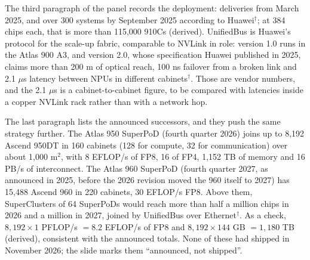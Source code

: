 \documentclass[11pt,letterpaper]{article}
\begin{document}
The third paragraph of the panel records the deployment: deliveries from March 2025, and over 300 systems by September 2025 according to Huawei$^\dagger$; at 384 chips each, that is more than 115{,}000 910Cs (derived). UnifiedBus is Huawei's protocol for the scale-up fabric, comparable to NVLink in role: version 1.0 runs in the Atlas 900 A3, and version 2.0, whose specification Huawei published in 2025, claims more than 200 m of optical reach, 100 ns failover from a broken link and 2.1 $\mu$s latency between NPUs in different cabinets$^\dagger$. Those are vendor numbers, and the 2.1 $\mu$s is a cabinet-to-cabinet figure, to be compared with latencies inside a copper NVLink rack rather than with a network hop.

The last paragraph lists the announced successors, and they push the same strategy further. The Atlas 950 SuperPoD (fourth quarter 2026) joins up to 8{,}192 Ascend 950DT in 160 cabinets (128 for compute, 32 for communication) over about 1{,}000 m$^2$, with 8 EFLOP/s of FP8, 16 of FP4, 1{,}152 TB of memory and 16 PB/s of interconnect. The Atlas 960 SuperPoD (fourth quarter 2027, as announced in 2025, before the 2026 revision moved the 960 itself to 2027) has 15{,}488 Ascend 960 in 220 cabinets, 30 EFLOP/s FP8. Above them, SuperClusters of 64 SuperPoDs would reach more than half a million chips in 2026 and a million in 2027, joined by UnifiedBus over Ethernet$^\dagger$. As a check, $8{,}192\times1$ PFLOP/s $= 8.2$ EFLOP/s of FP8 and $8{,}192\times 144$ GB $= 1{,}180$ TB (derived), consistent with the announced totals. None of these had shipped in November 2026; the slide marks them ``announced, not shipped''.
\end{document}
